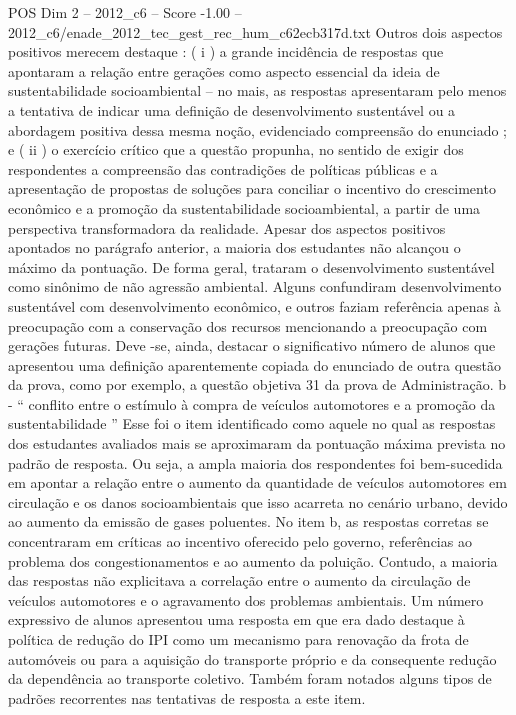 \begin{textsample}{POS Dim 2 – 2012\_c6 – Score -1.00 – 2012\_c6/enade\_2012\_tec\_gest\_rec\_hum\_c62ecb317d.txt}
Outros dois aspectos positivos merecem destaque : ( i ) a grande incidência de respostas que apontaram a relação entre gerações como aspecto essencial da ideia de sustentabilidade socioambiental – no mais, as respostas apresentaram pelo menos a tentativa de indicar uma definição de desenvolvimento sustentável ou a abordagem positiva dessa mesma noção, evidenciado compreensão do enunciado ; e ( ii ) o exercício crítico que a questão propunha, no sentido de exigir dos respondentes a compreensão das contradições de políticas públicas e a apresentação de propostas de soluções para conciliar o incentivo do crescimento econômico e a promoção da sustentabilidade socioambiental, a partir de uma perspectiva transformadora da realidade.
Apesar dos aspectos positivos apontados no parágrafo anterior, a maioria dos estudantes não alcançou o máximo da pontuação.
De forma geral, trataram o desenvolvimento sustentável como sinônimo de não agressão ambiental.
Alguns confundiram desenvolvimento sustentável com desenvolvimento econômico, e outros faziam referência apenas à preocupação com a conservação dos recursos mencionando a preocupação com gerações futuras.
Deve -se, ainda, destacar o significativo número de alunos que apresentou uma definição aparentemente copiada do enunciado de outra questão da prova, como por exemplo, a questão objetiva 31 da prova de Administração. b - “ conflito entre o estímulo à compra de veículos automotores e a promoção da sustentabilidade ” Esse foi o item identificado como aquele no qual as respostas dos estudantes avaliados mais se aproximaram da pontuação máxima prevista no padrão de resposta.
Ou seja, a ampla maioria dos respondentes foi bem-sucedida em apontar a relação entre o aumento da quantidade de veículos automotores em circulação e os danos socioambientais que isso acarreta no cenário urbano, devido ao aumento da emissão de gases poluentes.
No item b, as respostas corretas se concentraram em críticas ao incentivo oferecido pelo governo, referências ao problema dos congestionamentos e ao aumento da poluição.
Contudo, a maioria das respostas não explicitava a correlação entre o aumento da circulação de veículos automotores e o agravamento dos problemas ambientais.
Um número expressivo de alunos apresentou uma resposta em que era dado destaque à política de redução do IPI como um mecanismo para renovação da frota de automóveis ou para a aquisição do transporte próprio e da consequente redução da dependência ao transporte coletivo.
Também foram notados alguns tipos de padrões recorrentes nas tentativas de resposta a este item.

\end{textsample}
